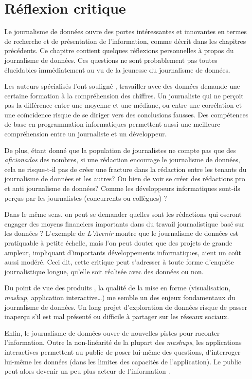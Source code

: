 
\chapter{Réflexion critique}

Le journalisme de données ouvre des portes intéressantes et innovantes en termes de
recherche et de présentation de l'information, comme décrit dans les chapitres 
précédents. Ce chapitre contient quelques réflexions personnelles à propos du journalisme 
de données. Ces questions ne sont probablement pas toutes élucidables immédiatement
au vu de la jeunesse du journalisme de données.

Les auteurs spécialisés l'ont souligné \cite{handbook, bradshaw, meyer}, travailler
avec des données demande une certaine formation à la compréhension des chiffres. Un 
journaliste qui ne perçoit pas la différence entre une moyenne et une médiane, 
ou entre une corrélation et une coïncidence risque de se diriger vers des conclusions
fausses. Des compétences de base en programmation informatiques permettent aussi
une meilleure compréhension entre un journaliste et un développeur.

De plus, étant donné que la population de journalistes ne compte pas que des 
\textit{aficionados} 
des nombres, si une rédaction encourage le journalisme de données, cela ne risque-t-il 
pas de créer une fracture dans la rédaction entre les tenants du journalisme de données 
et les autres? Ou bien de voir se créer des rédactions \og pro \fg et \og anti \fg 
journalisme de données? Comme les développeurs informatiques sont-ils perçus par 
les journalistes (concurrents ou collègues) ?

Dans le même sens, on peut se demander quelles sont les rédactions qui oseront 
engager des moyens financiers importants dans du travail journalistique basé sur les 
données ? L'exemple de \textit{L'Avenir} montre que le journalisme de données est 
pratiquable à petite échelle, mais l'on peut douter que des projets de grande ampleur,
impliquant d'importants développements informatiques, aient un coût aussi modéré. Ceci 
dit, cette critique peut s'adresser à toute forme d'enquête journalistique longue,
qu'elle soit réalisée avec des données ou non.

Du point de vue des \og produits \fg, la qualité de la mise en forme
(visualisation, \textit{mashup}, application interactive\dots) me semble un des enjeux
fondamentaux du journalisme de données. Un long projet d'exploration de données
risque de passer inaperçu s'il est mal présenté ou difficile à partager sur
les réseaux sociaux. 

Enfin, le journalisme de données ouvre de nouvelles pistes pour raconter l'information.
Outre la non-linéarité de la plupart des \textit{mashups}, les applications interactives
permettent au public de poser lui-même des questions, d'interroger lui-même les données (dans les limites des capacités de l'application). Le public peut alors devenir un peu plus \og acteur de l'information \fg.

